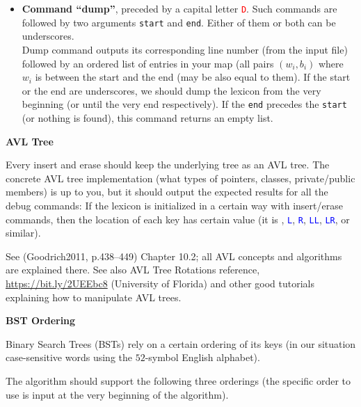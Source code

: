 \documentclass[11pt]{article}
\begin{document}
\begin{itemize}
an asterisk followed by some letters 
\textcolor{blue}{\tt L}, \textcolor{blue}{\tt R}
indicating the location of the node in the tree
(for example, \textcolor{blue}{\tt *LRR} means
that the key can be found going to the root, 
moving one step to the left and then two steps 
to the right.)
\item {\bf Command ``dump''}, preceded 
by a capital letter \textcolor{red}{\tt D}.
Such commands are followed by two arguments {\tt start} and
{\tt end}. Either of them or both can be underscores.\\
Dump command outputs its corresponding line number (from the input file) 
followed by an ordered list 
of entries in your map (all pairs $(w_i,b_i)$ 
where $w_i$ is between the start and the end (may be also equal to them).  
If the start or the end are underscores, we should dump the 
lexicon from the very beginning (or until the very end respectively).
If the {\tt end} precedes the {\tt start} (or nothing is found), 
this command returns an empty list.
\end{itemize}

\vspace{10pt}
{\bf AVL Tree}

Every insert and erase should keep the underlying 
tree as an AVL tree. 
The concrete AVL tree implementation (what types of pointers, 
classes, private/public members) is up to you, but it should
output the expected results for all the debug commands: 
If the lexicon is initialized in a certain way with insert/erase commands, 
then the location of each key has certain value (it is \textcolor{blue}{\tt *}, 
\textcolor{blue}{\tt *L}, \textcolor{blue}{\tt *R}, \textcolor{blue}{\tt *LL}, 
\textcolor{blue}{\tt *LR}, or similar). 

See (Goodrich2011, p.438--449) Chapter 10.2; all 
AVL concepts and algorithms are explained there.
See also AVL Tree Rotations reference, \url{https://bit.ly/2UEEbc8} 
(University of Florida)
and other good tutorials explaining how to manipulate AVL trees. 



\vspace{10pt}
{\bf BST Ordering}

Binary Search Trees (BSTs) rely on a certain ordering of its 
keys (in our situation \textendash{} case-sensitive words 
using the $52$-symbol English alphabet). 

The algorithm should support the following three orderings
(the specific order to use is input at the very beginning
of the algorithm). 
\end{document}
